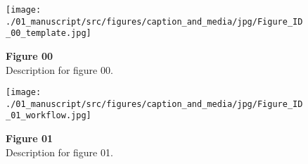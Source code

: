 
\begin{figure*}[p]
    \centering
    \texttt{[image: ./01\_manuscript/src/figures/caption\_and\_media/jpg/Figure\_ID\_00\_template.jpg]}
    \caption{
\textbf{
Figure 00
}
\smallskip
\\
Description for figure 00.
}
    \label{fig:00_template}
\end{figure*}

\clearpage
\begin{figure*}[p]
    \centering
    \texttt{[image: ./01\_manuscript/src/figures/caption\_and\_media/jpg/Figure\_ID\_01\_workflow.jpg]}
    \caption{
\textbf{
Figure 01
}
\smallskip
\\
Description for figure 01.
}
    \label{fig:01_workflow}
\end{figure*}

